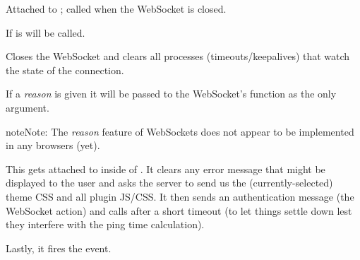 \documentclass[letterpaper,10pt,openany]{sphinxmanual}
\begin{document}
\begin{fulllineitems}
\begin{fulllineitems}
\begin{fulllineitems}
\label{Developer/js_gateone:GateOne.Net.onClose}
Attached to ; called when the WebSocket is closed.

If  is  {\hyperref[Developer/js_gateone:GateOne.Net.connectionError]{}} will be called.

\end{fulllineitems}



\begin{fulllineitems}
\label{Developer/js_gateone:GateOne.Net.disconnect}
Closes the WebSocket and clears all processes (timeouts/keepalives) that watch the state of the connection.

If a \emph{reason} is given it will be passed to the WebSocket's  function as the only argument.

\begin{notice}{note}{Note:}
The \emph{reason} feature of WebSockets does not appear to be implemented in any browsers (yet).
\end{notice}

\end{fulllineitems}



\begin{fulllineitems}
\label{Developer/js_gateone:GateOne.Net.onOpen}
This gets attached to  inside of {\hyperref[Developer/js_gateone:GateOne.Net.connect]{}}.  It clears any error message that might be displayed to the user and asks the server to send us the (currently-selected) theme CSS and all plugin JS/CSS.  It then sends an authentication message (the  WebSocket action) and calls {\hyperref[Developer/js_gateone:GateOne.Net.ping]{}} after a short timeout (to let things settle down lest they interfere with the ping time calculation).

Lastly, it fires the  event.

\end{fulllineitems}




\end{fulllineitems}
\end{fulllineitems}
\end{document}
